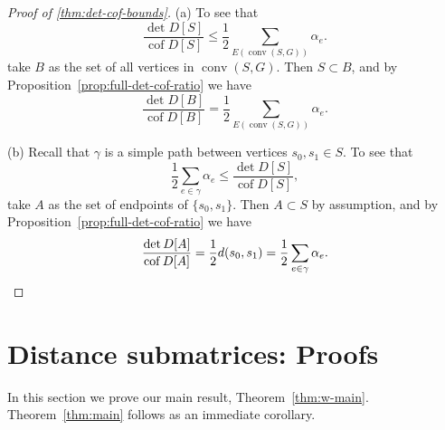 \documentclass{amsart}
\theoremstyle{definition}
\DeclareMathOperator{\cof}{cof}
\DeclareMathOperator{\conv}{conv}
\begin{document}
\begin{proof}[Proof of \ref{thm:det-cof-bounds}]
(a)
To see that
\begin{equation*}
 \frac{\det D[S]}{\cof D[S]} \leq \frac12 \sum_{E(\conv(S, G))} \alpha_e .
\end{equation*}
take $B$ as the set of all vertices in $\conv(S, G)$.
Then $S \subset B$, and by Proposition~\ref{prop:full-det-cof-ratio} we have
\[
 \frac{\det D[B]}{\cof D[B]} = \frac12 \sum_{E(\conv(S, G))} \alpha_e .
\]

(b) 
Recall that $\gamma$ is a simple path between vertices $s_0, s_1 \in S$.
To see that
\begin{equation*}
	\frac12 \sum_{e \in \gamma} \alpha_e \leq \frac{\det D[S]}{\cof D[S]},
\end{equation*}
take $A$ as the set of endpoints of $\{s_0, s_1\}$.
Then $A \subset S$ by assumption, and by Proposition~\ref{prop:full-det-cof-ratio} we have
\[
	\frac{\det D[A]}{\cof D[A]}
	= \frac12 d(s_0, s_1) 
	= \frac12 \sum_{e \in \gamma} \alpha_e .
	\qedhere
\]
\end{proof}


\section{Distance submatrices: Proofs}
In this section we prove our main result, Theorem~\ref{thm:w-main}.
Theorem~\ref{thm:main} follows as an immediate corollary.
\end{document}
